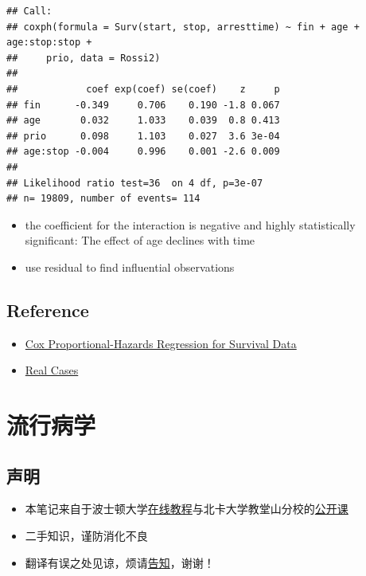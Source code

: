 \documentclass[
]{book}
\providecommand{\tightlist}{%
  \setlength{\itemsep}{0pt}\setlength{\parskip}{0pt}}
\begin{document}
\begin{verbatim}
## Call:
## coxph(formula = Surv(start, stop, arresttime) ~ fin + age + age:stop:stop + 
##     prio, data = Rossi2)
## 
##            coef exp(coef) se(coef)    z     p
## fin      -0.349     0.706    0.190 -1.8 0.067
## age       0.032     1.033    0.039  0.8 0.413
## prio      0.098     1.103    0.027  3.6 3e-04
## age:stop -0.004     0.996    0.001 -2.6 0.009
## 
## Likelihood ratio test=36  on 4 df, p=3e-07
## n= 19809, number of events= 114
\end{verbatim}

\begin{itemize}
\item
  the coefficient for the interaction is negative and highly statistically significant: The effect of age declines with time
\item
  use residual to find influential observations
\end{itemize}

\hypertarget{reference}{%
\section{Reference}\label{reference}}

\begin{itemize}
\tightlist
\item
  \href{http://cran.r-project.org/doc/contrib/Fox-Companion/appendix-cox-regression.pdf}{Cox Proportional-Hazards Regression for Survival Data}
\item
  \href{http://ehp.niehs.nih.gov/1104049/}{Real Cases}
\end{itemize}

\hypertarget{epid}{%
\chapter{流行病学}\label{epid}}

\hypertarget{ux58f0ux660e}{%
\section{声明}\label{ux58f0ux660e}}

\begin{itemize}
\tightlist
\item
  本笔记来自于波士顿大学\href{http://sphweb.bumc.bu.edu/otlt/MPH-Modules/Modules_Menu.html}{在线教程}与北卡大学教堂山分校的\href{https://www.coursera.org/learn/epidemiology/outline}{公开课}
\item
  二手知识，谨防消化不良
\item
  翻译有误之处见谅，烦请\href{mailto:yufreecas@gmail.com}{告知}，谢谢！
\end{itemize}
\end{document}
